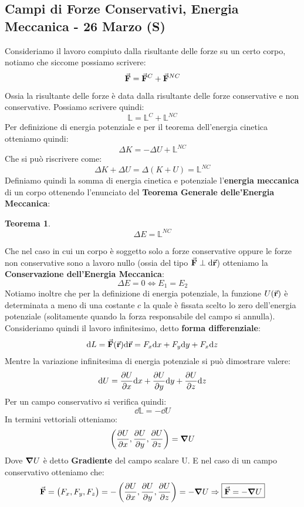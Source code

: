 \documentclass{article}
\newtheorem{thm}{Teorema}[section]
\newcommand{\then}{\ensuremath{\Rightarrow}}
\renewcommand{\r}{\va{r}}
\newcommand{\F}{\va{F}}
\begin{document}
\subsection{Campi di Forze Conservativi, Energia Meccanica - 26 Marzo (S)}
Consideriamo il lavoro compiuto dalla risultante delle forze su un certo corpo, notiamo che siccome possiamo scrivere:
\[\F=\F^C+\F^{NC}\]
Ossia la risultante delle forze è data dalla risultante delle forze conservative e non conservative. Possiamo scrivere quindi:
\[\mathbb{L}=\mathbb{L}^C+\mathbb{L}^{NC}\]
Per definizione di energia potenziale e per il teorema dell'energia cinetica otteniamo quindi:
\[\Delta K=-\Delta U+\mathbb{L}^{NC}\]
Che si può riscrivere come:
\[\Delta K+\Delta U=\Delta(K+U)=\mathbb{L}^{NC}\]
Definiamo quindi la somma di energia cinetica e potenziale l'\textbf{energia meccanica} di un corpo ottenendo l'enunciato del \textbf{Teorema Generale delle'Energia Meccanica}:
\begin{thm}
\begin{equation}
    \boxed{\Delta E=\mathbb{L}^{NC}}
\end{equation}
\end{thm}
Che nel caso in cui un corpo è soggetto solo a forze conservative oppure le forze non conservative sono a lavoro nullo (ossia del tipo $\F\perp\dd\r$) otteniamo la \textbf{Conservazione dell'Energia Meccanica}:
\begin{equation}
    \Delta E=0\iff E_1=E_2
\end{equation}
Notiamo inoltre che per la definizione di energia potenziale, la funzione $U(\r)$ è determinata a meno di una costante $c$ la quale è fissata scelto lo zero dell'energia potenziale (solitamente quando la forza responsabile del campo si annulla). 
Consideriamo quindi il lavoro infinitesimo, detto \textbf{forma differenziale}:
\[\dd L=\F(\r)\dd\r=F_x\dd x+F_y\dd y+F_x\dd z\]
Mentre la variazione infinitesima di energia potenziale si può dimostrare valere:
\[\dd U=\pdv{U}{x}\dd x+\pdv{U}{y}\dd y+\pdv{U}{z}\dd z\]
Per un campo conservativo si verifica quindi:
\[\dd \mathbb{L}=-\dd U\]
In termini vettoriali otteniamo:
\[\left(\pdv{U}{x},\pdv{U}{y},\pdv{U}{z}\right)=\grad{U}\]
Dove $\grad{U}$ è detto \textbf{Gradiente} del campo scalare U. E nel caso di un campo conservativo otteniamo che:
\[\F=\left(F_x,F_y,F_z\right)=-\left(\pdv{U}{x},\pdv{U}{y},\pdv{U}{z}\right)=-\grad{U}\then\boxed{ \F=-\grad{U}}\]
\end{document}
